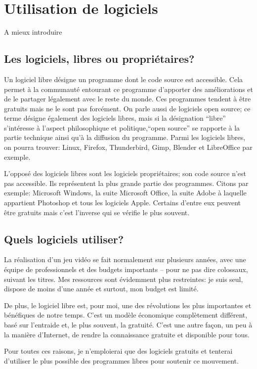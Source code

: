 \section{Utilisation de logiciels}
{\color{red} A mieux introduire}

\subsection{Les logiciels, libres ou propriétaires?}
Un logiciel libre désigne un programme dont le code source est accessible. Cela permet à la communauté entourant ce programme d'apporter des améliorations et de le partager légalement avec le reste du monde. Ces programmes tendent à être gratuits mais ne le sont pas forcément. On parle aussi de logiciels open source; ce terme désigne également des logiciels libres, mais si la désignation \enquote{libre} s'intéresse à l'aspect philosophique et politique,\enquote{open source} se rapporte à la partie technique ainsi qu'à la diffusion du programme. Parmi les logiciels libres, on pourra trouver: Linux, Firefox, Thunderbird, Gimp, Blender et LibreOffice par exemple.\cite{Logiciellibre_}\cite{Opensource_}

L'opposé des logiciels libres sont les logiciels propriétaires; son code source n'est pas accessible. Ils représentent la plus grande partie des programmes. Citons par exemple: Microsoft Windows, la suite Microsoft Office, la suite Adobe à laquelle appartient Photoshop et tous les logiciels Apple. Certains d'entre eux peuvent être gratuits mais c'est l'inverse qui se vérifie le plus souvent.

\subsection{Quels logiciels utiliser?}
La réalisation d'un jeu vidéo se fait normalement sur plusieurs années, avec une équipe de professionnels et des budgets importants -- pour ne pas dire colossaux, suivant les titres. Mes ressources sont évidemment plus restreintes: je suis seul, dispose de moins d'une année et surtout, mon budget est limité.

De plus, le logiciel libre est, pour moi, une des révolutions les plus importantes et bénéfiques de notre temps. C'est un modèle économique complètement différent, basé sur l'entraide et, le plus souvent, la gratuité. C'est une autre façon, un peu à la manière d'Internet, de rendre la connaissance gratuite et disponible pour tous.

Pour toutes ces raisons, je n'emploierai que des logiciels gratuits et tenterai d'utiliser le plus possible des programmes libres pour soutenir ce mouvement.



